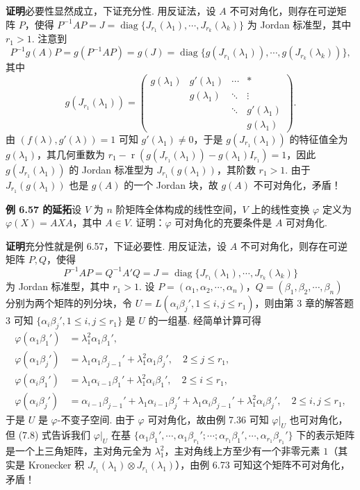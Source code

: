 \documentclass[UTF8, 12pt, fontset=fandol, oneside]{ctexart}
\begin{document}
\noindent\textbf{证明}\quad 必要性显然成立，下证充分性. 用反证法，设 $A$ 不可对角化，则存在可逆矩阵 $P$，使得 $P^{-1}AP=J=\operatorname{diag}\{J_{r_1}(\lambda_1),\cdots,J_{r_k}(\lambda_k)\}$ 为 Jordan 标准型，其中 $r_1>1$. 注意到
\[
P^{-1}g(A)P=g(P^{-1}AP)=g(J)=\operatorname{diag}\{g(J_{r_1}(\lambda_1)),\cdots,g(J_{r_k}(\lambda_k))\},
\]
其中
\[
g(J_{r_1}(\lambda_1))=
\left(\begin{array}{ccccc}
g(\lambda_1) & g'(\lambda_1) & \cdots & *\\
             & g(\lambda_1)  & \ddots & \vdots\\
             &               & \ddots & g'(\lambda_1)\\
             &               &        & g(\lambda_1)
\end{array}\right).
\]
由 $(f(\lambda),g'(\lambda))=1$ 可知 $g'(\lambda_1)\ne 0$，于是 $g(J_{r_1}(\lambda_1))$ 的特征值全为 $g(\lambda_1)$，其几何重数为 $r_1-\operatorname{r}(g(J_{r_1}(\lambda_1))-g(\lambda_1)I_{r_1})=1$，因此 $g(J_{r_1}(\lambda_1))$ 的 Jordan 标准型为 $J_{r_1}(g(\lambda_1))$，其阶数 $r_1>1$. 由于 $J_{r_1}(g(\lambda_1))$ 也是 $g(A)$ 的一个 Jordan 块，故 $g(A)$ 不可对角化，矛盾！

\noindent\textbf{例 6.57 的延拓}\quad 设 $V$ 为 $n$ 阶矩阵全体构成的线性空间，$V$ 上的线性变换 $\varphi$ 定义为 $\varphi(X)=AXA$，其中 $A\in V$. 证明：$\varphi$ 可对角化的充要条件是 $A$ 可对角化.

\noindent\textbf{证明}\quad 充分性就是例 6.57，下证必要性. 用反证法，设 $A$ 不可对角化，则存在可逆矩阵 $P,Q$，使得
\[
P^{-1}AP=Q^{-1}A'Q=J=\operatorname{diag}\{J_{r_1}(\lambda_1),\cdots,J_{r_k}(\lambda_k)\}
\]
为 Jordan 标准型，其中 $r_1>1$. 设 $P=(\alpha_1,\alpha_2,\cdots,\alpha_n)$，$Q=(\beta_1,\beta_2,\cdots,\beta_n)$ 分别为两个矩阵的列分块，令 $U=L(\alpha_i\beta_j',1\le i,j\le r_1)$，则由第 3 章的解答题 3 可知 $\{\alpha_i\beta_j',1\le i,j\le r_1\}$ 是 $U$ 的一组基. 经简单计算可得
\begin{equation}
\begin{array}{rl}
\varphi(\alpha_1\beta_1')&=\lambda_1^2\alpha_1\beta_1',\\
\varphi(\alpha_1\beta_j')&=\lambda_1\alpha_1\beta_{j-1}'+\lambda_1^2\alpha_1\beta_j',\quad 2\le j\le r_1,\\
\varphi(\alpha_i\beta_1')&=\lambda_1\alpha_{i-1}\beta_1'+\lambda_1^2\alpha_i\beta_1',\quad 2\le i\le r_1,\\
\varphi(\alpha_i\beta_j')&=\alpha_{i-1}\beta_{j-1}'+\lambda_1\alpha_{i-1}\beta_j'
+\lambda_1\alpha_i\beta_{j-1}'+\lambda_1^2\alpha_i\beta_j',\quad 2\le i,j\le r_1,
\end{array}
\tag{7.8}
\end{equation}
于是 $U$ 是 $\varphi$-不变子空间. 由于 $\varphi$ 可对角化，故由例 7.36 可知 $\varphi|_U$ 也可对角化，但 (7.8) 式告诉我们 $\varphi|_U$ 在基 $\{\alpha_1\beta_1',\cdots,\alpha_1\beta_{r_1}';\cdots;\alpha_{r_1}\beta_1',\cdots,\alpha_{r_1}\beta_{r_1}'\}$ 下的表示矩阵是一个上三角矩阵，主对角元全为 $\lambda_1^2$，主对角线上方至少有一个非零元素 $1$（其实是 Kronecker 积 $J_{r_1}(\lambda_1)\otimes J_{r_1}(\lambda_1)$），由例 6.73 可知这个矩阵不可对角化，矛盾！
\end{document}
